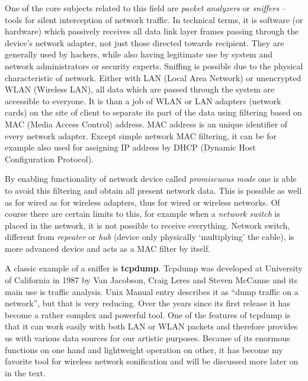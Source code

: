 \documentclass[11pt,a4paper,oneside]{report}
\begin{document}

One of the core subjects related to this field are \textit{packet analyzers} or \textit{sniffers} – tools for silent interception of network traffic. In technical terms, it is software (or hardware) which passively receives all data link layer frames passing through the device’s network adapter, not just those directed towards recipient. They are generally used by hackers, while also having legitimate use by system and network administrators or security experts. 
Sniffing is possible due to the physical characteristic of network. Either with LAN (Local Area Network) or unencrypted WLAN (Wireless LAN), all data which are passed through the system are accessible to everyone. It is than a job of WLAN or LAN adapters (network cards) on the site of client to separate its part of the data using filtering based on MAC (Media Access Control) address. MAC address is an unique identifier of every network adapter. Except simple network MAC filtering, it can be for example also used for assigning IP address by DHCP (Dynamic Host Configuration Protocol).

By enabling functionality of network device called \textit{promiscuous mode} one is able to avoid this filtering and obtain all present network data. This is possible as well as for wired as for wireless adapters, thus for wired or wireless networks. Of course there are certain limits to this, for example when a \textit{network switch} is placed in the network, it is not possible to receive everything. Network switch, different from \textit{repeater} or \textit{hub} (device only physically `multiplying' the cable), is more advanced device and acts as a MAC filter by itself. \cite{Pallavi2012}

A classic example of a sniffer is \textbf{tcpdump}. Tcpdump was developed at University of California in 1987 by Van Jacobson, Craig Leres and Steven McCanne and its main use is traffic analysis. Unix Manual entry describes it as ``dump traffic on a network'', but that is very reducing. Over the years since its first release it has become a rather complex and powerful tool. One of the features of tcpdump is that it can work easily with both LAN or WLAN packets and therefore provides us with various data sources for our artistic purposes. Because of its enormous functions on one hand and lightweight operation on other, it has become my favorite tool for wireless network sonification and will be discussed more later on in the text.
\end{document}
